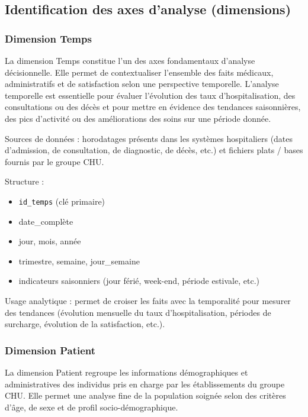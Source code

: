 \documentclass[12pt,a4paper]{article}
\begin{document}
\subsection{Identification des axes d'analyse (dimensions)}

\subsubsection{Dimension Temps}

La dimension Temps constitue l’un des axes fondamentaux d’analyse décisionnelle. Elle permet de contextualiser l’ensemble des faits médicaux, administratifs et de satisfaction selon une perspective temporelle. L’analyse temporelle est essentielle pour évaluer l’évolution des taux d’hospitalisation, des consultations ou des décès et pour mettre en évidence des tendances saisonnières, des pics d’activité ou des améliorations des soins sur une période donnée.

Sources de données : horodatages présents dans les systèmes hospitaliers (dates d’admission, de consultation, de diagnostic, de décès, etc.) et fichiers plats / bases fournis par le groupe CHU.

Structure :
\begin{itemize}
    \item \texttt{id\_temps} (clé primaire)
    \item date\_complète
    \item jour, mois, année
    \item trimestre, semaine, jour\_semaine
    \item indicateurs saisonniers (jour férié, week-end, période estivale, etc.)
\end{itemize}

Usage analytique : permet de croiser les faits avec la temporalité pour mesurer des tendances (évolution mensuelle du taux d’hospitalisation, périodes de surcharge, évolution de la satisfaction, etc.).

\subsubsection{Dimension Patient}

La dimension Patient regroupe les informations démographiques et administratives des individus pris en charge par les établissements du groupe CHU. Elle permet une analyse fine de la population soignée selon des critères d’âge, de sexe et de profil socio-démographique.
\end{document}
